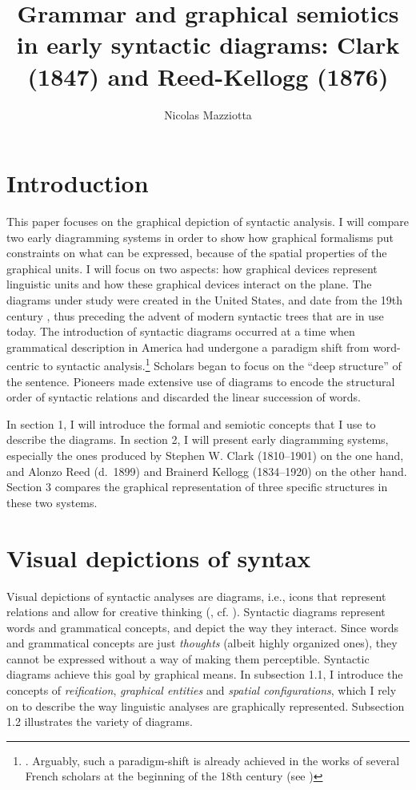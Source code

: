 \documentclass[output=paper]{langsci/langscibook}
\author{Nicolas Mazziotta\affiliation{Université de Liège}}
\title{Grammar and graphical semiotics in early syntactic diagrams: Clark (1847) and Reed-Kellogg (1876)}
\begin{document}
\maketitle

\section{Introduction} 

This paper focuses on the graphical depiction of syntactic analysis. I will compare two early diagramming systems in order to show how graphical formalisms put constraints on what can be expressed, because of the spatial properties of the graphical units. I will focus on two aspects: how graphical devices represent linguistic units and how these graphical devices interact on the plane. The diagrams under study were created in the United States, and date from the 19th century \citep{brittain_critical_1973}, thus preceding the advent of modern syntactic trees that are in use today. The introduction of syntactic diagrams occurred at a time when grammatical description in America had undergone a paradigm shift from word-centric to syntactic analysis.\footnote{\textrm{\citet[76]{aarts_handbook_2006}. Arguably, such a paradigm-shift is already achieved in the works of several French scholars at the beginning of the 18th century (see \citealt{imrenyi_how_2020})}} Scholars began to focus on the “deep structure” of the sentence. Pioneers made extensive use of diagrams to encode the structural order of syntactic relations and discarded the linear succession of words. 

In section 1, I will introduce the formal and semiotic concepts that I use to describe the diagrams. In section 2, I will present early diagramming systems, especially the ones produced by Stephen W. Clark (1810–1901) on the one hand, and Alonzo Reed (d.~1899) and Brainerd Kellogg (1834–1920) on the other hand. Section 3 compares the graphical representation of three specific structures in these two systems.

\section{Visual depictions of syntax}

Visual depictions of syntactic analyses are diagrams, i.e., icons that represent relations and allow for creative thinking (\citealt{peirce_collected_1994}, cf. \citealt[36-42]{chauvire_oeil_2008}). Syntactic diagrams represent words and grammatical concepts, and depict the way they interact. Since words and grammatical concepts are just \textit{thoughts} (albeit highly organized ones), they cannot be expressed without a way of making them perceptible. Syntactic diagrams achieve this goal by graphical means. In subsection 1.1, I introduce the concepts of \textit{reification}, \textit{graphical entities} and \textit{spatial configurations}, which I rely on to describe the way linguistic analyses are graphically represented. Subsection 1.2 illustrates the variety of diagrams. 
\end{document}
